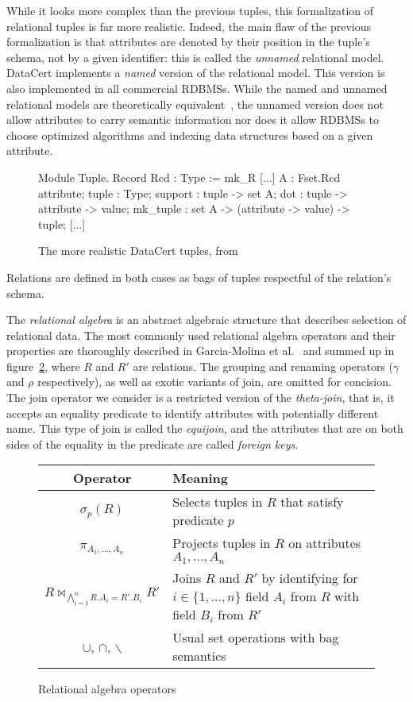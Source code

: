 \documentclass[11pt]{article}
\begin{document}
While it looks more complex than the previous tuples, this formalization of relational tuples is far more realistic.
Indeed, the main flaw of the previous formalization is that attributes are denoted by their position in the tuple's schema, not by a given identifier:
this is called the \emph{unnamed} relational model.
DataCert implements a \emph{named} version of the relational model. This version is also implemented in all commercial RDBMSs.
While the named and unnamed relational models are theoretically equivalent~\cite{CFRDM},
the unnamed version does not allow attributes to carry semantic information nor does it allow RDBMSs to choose optimized algorithms and indexing data structures based on a given attribute.
 
\begin{figure}
  \begin{coq}
    Module Tuple.
    Record Rcd : Type := mk_R {
      [...]
      A : Fset.Rcd attribute;
      tuple : Type;
      support : tuple -> set A;
      dot : tuple -> attribute -> value;
      mk_tuple : set A -> (attribute -> value) -> tuple;
      [...] }
  \end{coq}
  \caption{The more realistic DataCert tuples, from~\cite{CFRDM}}
  \label{datacert_tuples}
\end{figure}
Relations are defined in both cases as bags of tuples respectful of the relation's schema.

The \emph{relational algebra} is an abstract algebraic structure that describes selection of relational data. The most commonly used relational algebra operators and their properties are thoroughly described in Garcia-Molina et al.~\cite{DSCB} and summed up in figure~\ref{relational_operators}, where $R$ and $R'$ are relations. The grouping and renaming operators ($\gamma$ and $\rho$ respectively), as well as exotic variants of join, are omitted for concision.
The join operator we consider is a restricted version of the \emph{theta-join}, that is, it accepts an equality predicate to identify attributes with potentially different name.
This type of join is called the \emph{equijoin}, and the attributes that are on both sides of the equality in the predicate are called \emph{foreign keys}.

\begin{figure}
\centering
\begin{tabu} to 0.9\textwidth {|c|X[cm]|}
  \hline
  \textbf{Operator} & \textbf{Meaning}\\
  \hline
  $\sigma_p(R)$ & Selects tuples in $R$ that satisfy predicate $p$\\
  \hline
  $\pi_{A_1,\dots,A_n}$ & Projects tuples in $R$ on attributes $A_1, \dots, A_n$\\
  \hline
  $R \bowtie_{\bigwedge_{i = 1}^n R.A_i = R'.B_i} R'$ & \strut Joins $R$ and $R'$ by identifying for $i \in \{1, \dots, n\}$
  field $A_i$ from $R$ with field $B_i$ from $R'$ \strut\\
  \hline
  $\cup$, $\cap$, $\backslash$ & Usual set operations with bag semantics\\
  \hline 
\end{tabu}
\caption{Relational algebra operators}
\label{relational_operators}
\end{figure} 
\end{document}
